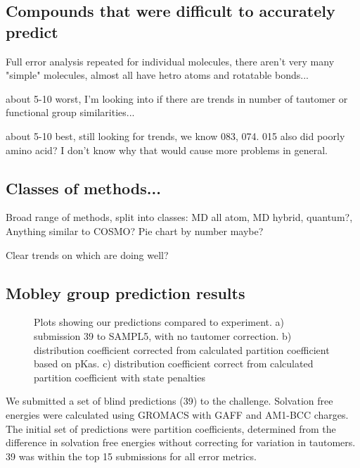 \subsection{Compounds that were difficult to accurately predict}
\label{results:4}
Full error analysis repeated for individual molecules, there aren't very many "simple" molecules, almost all have hetro atoms and rotatable bonds...

about 5-10 worst, I'm looking into if there are trends in number of tautomer or functional group similarities...

about 5-10 best, still looking for trends, we know 083, 074. 015 also did poorly amino acid? I don't know why that would cause more problems in general. 


\subsection{Classes of methods...}
\label{results:5}
Broad range of methods, split into classes: MD all atom, MD hybrid, quantum?, Anything similar to COSMO? %
Pie chart by number maybe?

Clear trends on which are doing well? 

\subsection{Mobley group prediction results}
\label{results:6}

\begin{figure*}
\caption{Plots showing our predictions compared to experiment. a) submission 39 to SAMPL5, with no tautomer correction. b) distribution coefficient corrected from calculated partition coefficient based on pKas. c) distribution coefficient correct from calculated partition coefficient with state penalties }
\label{myComparisons}       %
\end{figure*}

We submitted a set of blind predictions (39) to the challenge. 
Solvation free energies were calculated using GROMACS with GAFF and AM1-BCC charges. 
The initial set of predictions were partition coefficients, determined from the difference in solvation free energies without correcting for variation in tautomers. 
39 was within the top 15 %
submissions for all error metrics.  

